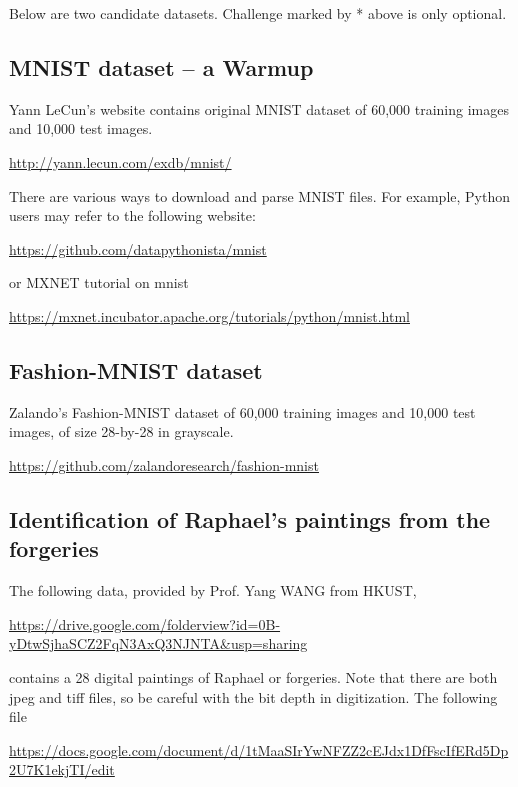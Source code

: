\documentclass[11pt]{article}
\begin{document}
Below are two candidate datasets. Challenge marked by * above is only optional. 

\subsection{MNIST dataset -- a Warmup}

Yann LeCun's website contains original MNIST dataset of 60,000 training images and 10,000 test images. 

\url{http://yann.lecun.com/exdb/mnist/}

There are various ways to download and parse MNIST files. For example, Python users may refer to the following website:

\url{https://github.com/datapythonista/mnist}

\noindent or MXNET tutorial on mnist

\url{https://mxnet.incubator.apache.org/tutorials/python/mnist.html}

\subsection{Fashion-MNIST dataset}

Zalando's Fashion-MNIST dataset of 60,000 training images and 10,000 test images, of size 28-by-28 in grayscale. 

\url{https://github.com/zalandoresearch/fashion-mnist}




\subsection{Identification of Raphael's paintings from the forgeries}

The following data, provided by Prof. Yang WANG from HKUST,

\url{https://drive.google.com/folderview?id=0B-yDtwSjhaSCZ2FqN3AxQ3NJNTA&usp=sharing}

\noindent contains a 28 digital paintings of Raphael or forgeries. Note that there are both jpeg and tiff files, so be careful with the bit depth in digitization. The following file

\url{https://docs.google.com/document/d/1tMaaSIrYwNFZZ2cEJdx1DfFscIfERd5Dp2U7K1ekjTI/edit}
\end{document}
